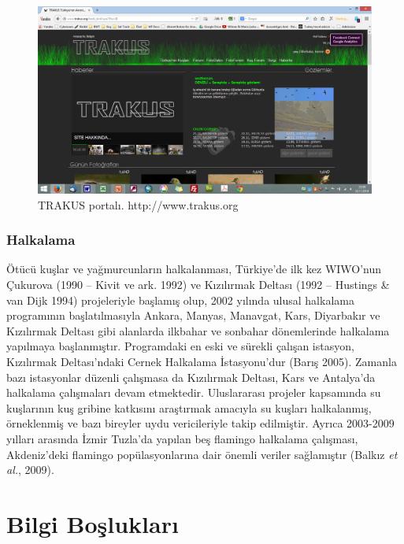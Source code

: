 \documentclass[
  a4paper,
  DIV=11,
  numbers=noendperiod]{scrreprt}
\begin{document}
\begin{figure}[H]

{\centering \includegraphics{images/trakus.png}

}

\caption{TRAKUS portalı. http://www.trakus.org}

\end{figure}%

\subsection*{Halkalama}\label{halkalama}

Ötücü kuşlar ve yağmurcunların halkalanması, Türkiye'de ilk kez WIWO'nun
Çukurova (1990 -- Kivit ve ark. 1992) ve Kızılırmak Deltası (1992 --
Hustings \& van Dijk 1994) projeleriyle başlamış olup, 2002 yılında
ulusal halkalama programının başlatılmasıyla Ankara, Manyas, Manavgat,
Kars, Diyarbakır ve Kızılırmak Deltası gibi alanlarda ilkbahar ve
sonbahar dönemlerinde halkalama yapılmaya başlanmıştır. Programdaki en
eski ve sürekli çalışan istasyon, Kızılırmak Deltası'ndaki Cernek
Halkalama İstasyonu'dur (Barış 2005). Zamanla bazı istasyonlar düzenli
çalışmasa da Kızılırmak Deltası, Kars ve Antalya'da halkalama
çalışmaları devam etmektedir. Uluslararası projeler kapsamında su
kuşlarının kuş gribine katkısını araştırmak amacıyla su kuşları
halkalanmış, örneklenmiş ve bazı bireyler uydu vericileriyle takip
edilmiştir. Ayrıca 2003-2009 yılları arasında İzmir Tuzla'da yapılan beş
flamingo halkalama çalışması, Akdeniz'deki flamingo popülasyonlarına
dair önemli veriler sağlamıştır (Balkız \emph{et al.}, 2009).


\chapter*{Bilgi Boşlukları}\label{bilgi-boux15fluklarux131}
\end{document}
